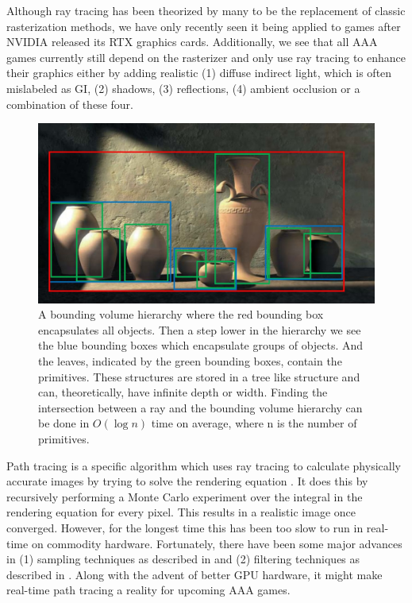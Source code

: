 Although ray tracing has been theorized by many to be the replacement of classic rasterization methods, we have only recently seen it being applied to games after NVIDIA released its RTX graphics cards. Additionally, we see that all AAA games currently still depend on the rasterizer and only use ray tracing to enhance their graphics either by adding realistic (1) diffuse indirect light, which is often mislabeled as GI, (2) shadows, (3) reflections, (4) ambient occlusion or a combination of these four\cite{NVIDIARTX}.
\begin{figure}[H]
    \centering
    \includegraphics[width=0.9\linewidth]{figures/bvh.jpg}
    \caption{A bounding volume hierarchy where the red bounding box encapsulates all objects. Then a step lower in the hierarchy we see the blue bounding boxes which encapsulate groups of objects. And the leaves, indicated by the green bounding boxes, contain the primitives. These structures are stored in a tree like structure and can, theoretically, have infinite depth or width. Finding the intersection between a ray and the bounding volume hierarchy can be done in $O(\log n)$ time on average, where n is the number of primitives. \cite{BVHJacco}}
    \label{fig:bvh}
\end{figure}

Path tracing is a specific algorithm which uses ray tracing to calculate physically accurate images by trying to solve the rendering equation \cite{kajiya1986rendering}. It does this by recursively performing a Monte Carlo experiment over the integral in the rendering equation for every pixel. This results in a realistic image once converged. However, for the longest time this has been too slow to run in real-time on commodity hardware. Fortunately, there have been some major advances in (1) sampling techniques as described in \cite{lin2022generalized} and (2) filtering techniques as described in \cite{yang2020survey}. Along with the advent of better GPU hardware, it might make real-time path tracing a reality for upcoming AAA games.

